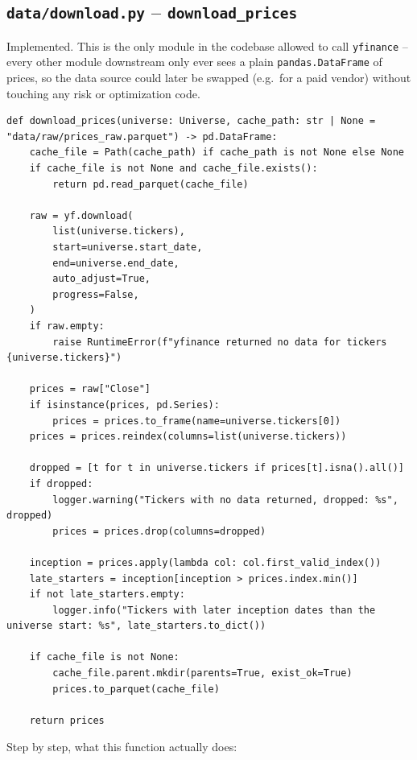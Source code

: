 \documentclass[11pt]{article}
\begin{document}
\subsection{\texttt{data/download.py} -- \texttt{download\_prices}}

Implemented. This is the only module in the codebase allowed to call
\texttt{yfinance} -- every other module downstream only ever sees a plain
\texttt{pandas.DataFrame} of prices, so the data source could later be
swapped (e.g.\ for a paid vendor) without touching any risk or
optimization code.

\begin{lstlisting}
def download_prices(universe: Universe, cache_path: str | None = "data/raw/prices_raw.parquet") -> pd.DataFrame:
    cache_file = Path(cache_path) if cache_path is not None else None
    if cache_file is not None and cache_file.exists():
        return pd.read_parquet(cache_file)

    raw = yf.download(
        list(universe.tickers),
        start=universe.start_date,
        end=universe.end_date,
        auto_adjust=True,
        progress=False,
    )
    if raw.empty:
        raise RuntimeError(f"yfinance returned no data for tickers {universe.tickers}")

    prices = raw["Close"]
    if isinstance(prices, pd.Series):
        prices = prices.to_frame(name=universe.tickers[0])
    prices = prices.reindex(columns=list(universe.tickers))

    dropped = [t for t in universe.tickers if prices[t].isna().all()]
    if dropped:
        logger.warning("Tickers with no data returned, dropped: %s", dropped)
        prices = prices.drop(columns=dropped)

    inception = prices.apply(lambda col: col.first_valid_index())
    late_starters = inception[inception > prices.index.min()]
    if not late_starters.empty:
        logger.info("Tickers with later inception dates than the universe start: %s", late_starters.to_dict())

    if cache_file is not None:
        cache_file.parent.mkdir(parents=True, exist_ok=True)
        prices.to_parquet(cache_file)

    return prices
\end{lstlisting}

Step by step, what this function actually does:
\end{document}
